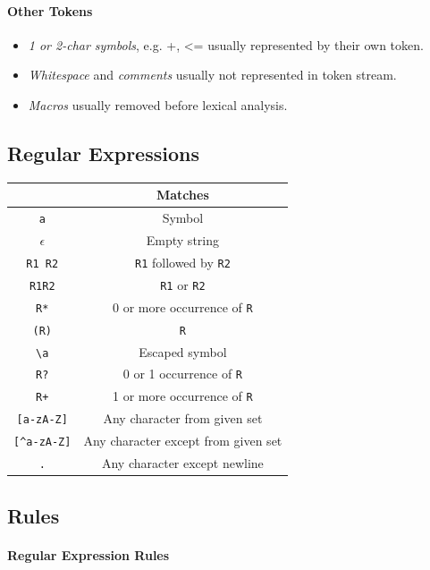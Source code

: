 \documentclass[twocolumn,english]{article}
\providecommand{\tabularnewline}{\\}
\providecommand{\tabularnewline}{\\}
\begin{document}
\paragraph{Other Tokens}
\begin{itemize}
\item \emph{1 or 2-char symbols}, e.g. +, \textless{}= usually represented
by their own token.
\item \emph{Whitespace} and \emph{comments} usually not represented in token
stream.
\item \emph{Macros} usually removed before lexical analysis.
\end{itemize}

\subsection{Regular Expressions}

\begin{table}[H]
\centering{}%
\begin{tabular}{cc}
\toprule 
 & \textbf{\footnotesize{}Matches}\tabularnewline
\midrule
\texttt{a} & {\footnotesize{}Symbol}\tabularnewline
$\epsilon$ & {\footnotesize{}Empty string}\tabularnewline
\texttt{R1 R2} & \texttt{\footnotesize{}R1}{\footnotesize{} followed by }\texttt{\footnotesize{}R2}\tabularnewline
\texttt{R1\textbar{}R2} & \texttt{\footnotesize{}R1}{\footnotesize{} or }\texttt{\footnotesize{}R2}\tabularnewline
\texttt{R{*}} & {\footnotesize{}0 or more occurrence of }\texttt{\footnotesize{}R}\tabularnewline
\texttt{(R)} & \texttt{\footnotesize{}R}\tabularnewline
\texttt{\textbackslash{}a} & {\footnotesize{}Escaped symbol}\tabularnewline
\midrule
\texttt{R?} & {\footnotesize{}0 or 1 occurrence of }\texttt{\footnotesize{}R}\tabularnewline
\texttt{R+} & {\footnotesize{}1 or more occurrence of }\texttt{\footnotesize{}R}\tabularnewline
\texttt{{[}a-zA-Z{]}} & {\footnotesize{}Any character from given set}\tabularnewline
\texttt{{[}\textasciicircum{}a-zA-Z{]}} & {\footnotesize{}Any character except from given set}\tabularnewline
\texttt{.} & {\footnotesize{}Any character except newline}\tabularnewline
\bottomrule
\end{tabular}
\end{table}

\subsection{Rules}

\paragraph{Regular Expression Rules}
\end{document}
